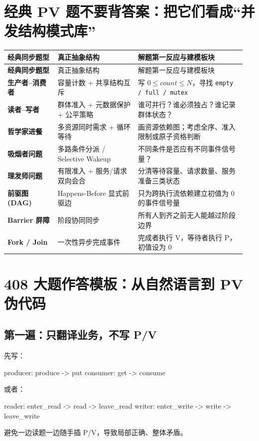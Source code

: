 \documentclass[11pt,a4paper]{ctexart}
\newcommand{\code}[1]{\texttt{#1}}
\begin{document}
\section{经典 PV 题不要背答案：把它们看成“并发结构模式库”}

\begingroup
\small
\renewcommand{\arraystretch}{1.25}
\begin{longtable}{>{\bfseries}p{0.2\linewidth} p{0.32\linewidth} p{0.43\linewidth}}
\toprule
经典同步题型 & 真正抽象结构 & 解题第一反应与建模板块\\
\midrule
\endfirsthead
\toprule
经典同步题型 & 真正抽象结构 & 解题第一反应与建模板块\\
\midrule
\endhead
生产者--消费者 & 容量计数 + 共享结构互斥 & 写 $0\le count\le N$，寻找 \code{empty / full / mutex}\\
读者--写者 & 群体准入 + 元数据保护 + 公平策略 & 谁可并行？谁必须独占？谁记录群体状态？\\
哲学家进餐 & 多资源同时需求 + 循环等待 & 画资源依赖图；考虑全序、准入限制或原子资格判断\\
吸烟者问题 & 多路条件分派 / Selective Wakeup & 不同条件是否应有不同事件信号量？\\
理发师问题 & 有限准入 + 服务/请求双向会合 & 分清等待容量、请求数量、服务准备三类状态\\
前驱图 (DAG) & Happens-Before 显式前驱边 & 只为跨执行流依赖建立初值为 0 的事件信号量\\
Barrier 屏障 & 阶段协同同步 & 所有人到齐之前无人能越过阶段边界\\
Fork / Join & 一次性异步完成事件 & 完成者执行 V，等待者执行 P，初值设为 0\\
\bottomrule
\end{longtable}
\endgroup

\section{408 大题作答模板：从自然语言到 PV 伪代码}

\subsection{第一遍：只翻译业务，不写 P/V}

先写：
\begin{codeblock}
producer: produce -> put
consumer: get -> consume
\end{codeblock}
或者：
\begin{codeblock}
reader: enter_read -> read -> leave_read
writer: enter_write -> write -> leave_write
\end{codeblock}
避免一边读题一边随手插 P/V，导致局部正确、整体矛盾。
\end{document}
